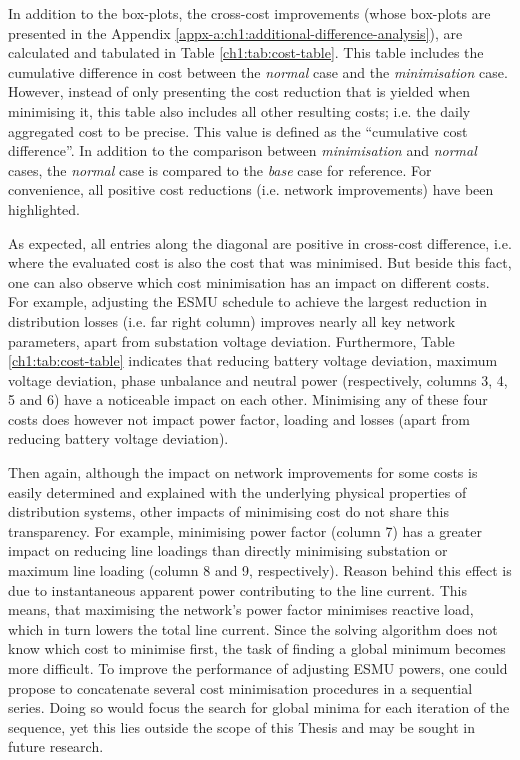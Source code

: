 In addition to the box-plots, the cross-cost improvements (whose box-plots are presented in the Appendix \ref{appx-a:ch1:additional-difference-analysis}), are calculated and tabulated in Table \ref{ch1:tab:cost-table}.
This table includes the cumulative difference in cost between the \textit{normal} case and the \textit{minimisation} case.
However, instead of only presenting the cost reduction that is yielded when minimising it, this table also includes all other resulting costs; i.e. the daily aggregated cost to be precise.
This value is defined as the ``cumulative cost difference''.
In addition to the comparison between \textit{minimisation} and \textit{normal} cases, the \textit{normal} case is compared to the \textit{base} case for reference.
For convenience, all positive cost reductions (i.e. network improvements) have been highlighted.



As expected, all entries along the diagonal are positive in cross-cost difference, i.e. where the evaluated cost is also the cost that was minimised.
But beside this fact, one can also observe which cost minimisation has an impact on different costs.
For example, adjusting the ESMU schedule to achieve the largest reduction in distribution losses (i.e. far right column) improves nearly all key network parameters, apart from substation voltage deviation.
Furthermore, Table \ref{ch1:tab:cost-table} indicates that reducing battery voltage deviation, maximum voltage deviation, phase unbalance and neutral power (respectively, columns 3, 4, 5 and 6) have a noticeable impact on each other.
Minimising any of these four costs does however not impact power factor, loading and losses (apart from reducing battery voltage deviation).

Then again, although the impact on network improvements for some costs is easily determined and explained with the underlying physical properties of distribution systems, other impacts of minimising cost do not share this transparency.
For example, minimising power factor (column 7) has a greater impact on reducing line loadings than directly minimising substation or maximum line loading (column 8 and 9, respectively).
Reason behind this effect is due to instantaneous apparent power contributing to the line current.
This means, that maximising the network's power factor minimises reactive load, which in turn lowers the total line current.
Since the solving algorithm does not know which cost to minimise first, the task of finding a global minimum becomes more difficult.
To improve the performance of adjusting ESMU powers, one could propose to concatenate several cost minimisation procedures in a sequential series.
Doing so would focus the search for global minima for each iteration of the sequence, yet this lies outside the scope of this Thesis and may be sought in future research.

